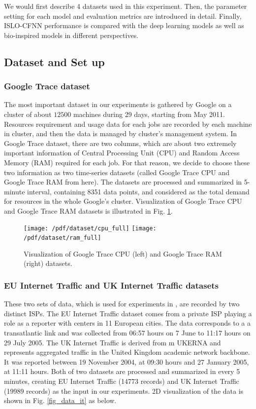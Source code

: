 \documentclass[a4paper,13pt,2p]{report}
\begin{document}
	We would first describe 4 datasets used in this experiment. Then, the parameter setting for each model and evaluation metrics are introduced in detail. Finally, ISLO-CFNN performance is compared with the deep learning models as well as bio-inspired models in different perspectives.

\subsection{Dataset and Set up}
\label{exp:data}

\subsubsection{Google Trace dataset}
	The most important dataset in our experiments is gathered by Google on a cluster of about $12500$ machines \cite{reiss2011google} during 29 days, starting from May 2011. Resources requirement and usage data for each jobs are recorded by each machine in cluster, and then the data is managed by cluster's management system. In Google Trace dataset, there are two columns, which are about two extremely important information of Central Processing Unit (CPU) and Random Access Memory (RAM) required for each job. For that reason, we decide to choose these two information as two time-series datasets (called Google Trace CPU and Google Trace RAM from here). The datasets are processed and summarized in 5-minute interval, containing 8351 data points, and considered as the total demand for resources in the whole Google's cluster. Visualization of Google Trace CPU and Google Trace RAM datasets is illustrated in Fig. \ref{fig_data_ggtrace}. 
	
\begin{figure}[!ht] 
   \centering
   \texttt{[image: /pdf/dataset/cpu\_full]}
   \texttt{[image: /pdf/dataset/ram\_full]}
  \caption{Visualization of Google Trace CPU (left) and Google Trace RAM (right) datasets.} 
  \label{fig_data_ggtrace} 
\end{figure}
 
\subsubsection{EU Internet Traffic and UK Internet Traffic datasets}
	
	These two sets of data, which is used for experiments in \cite{cortez2012multi}, are recorded by two distinct ISPs. The EU Internet Traffic dataset comes from a private ISP playing a role as a reporter with centers  in 11 European cities. The data corresponds to a a transatlantic link and was collected from 06:57 hours on 7 June to 11:17 hours on 29 July 2005. The UK Internet Traffic is derived from m UKERNA and represents aggregated traffic in the United Kingdom academic network backbone. It was
reported between 19 November 2004, at 09:30
hours and 27 January 2005, at 11:11 hours. Both of two datasets are processed and summarized in every 5 minutes, creating EU Internet Traffic (14773 records) and UK Internet Traffic (19989 records) as the input in our experiments. 2D visualization of the data is shown in Fig. \ref{fig_data_it} as below.
\end{document}
